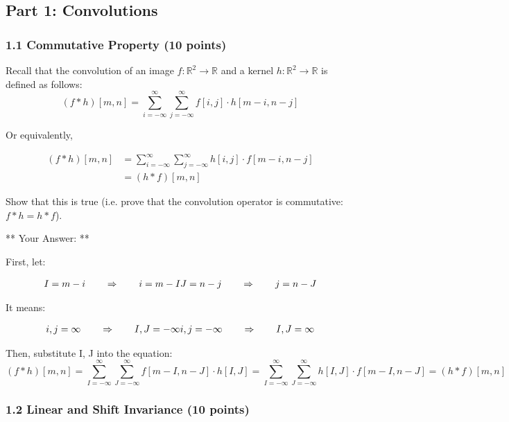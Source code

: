 \documentclass[11pt]{article}
\begin{document}
    \subsection{Part 1: Convolutions}\label{part-1-convolutions}

\subsubsection{1.1 Commutative Property (10
points)}\label{commutative-property-10-points}

Recall that the convolution of an image
\(f:\mathbb{R}^2\rightarrow \mathbb{R}\) and a kernel
\(h:\mathbb{R}^2\rightarrow\mathbb{R}\) is defined as follows:
\[(f*h)[m,n]=\sum_{i=-\infty}^\infty\sum_{j=-\infty}^\infty f[i,j]\cdot h[m-i,n-j]\]

Or equivalently,

\begin{align}
(f*h)[m,n] &= \sum_{i=-\infty}^\infty\sum_{j=-\infty}^\infty h[i,j]\cdot f[m-i,n-j]\\
&= (h*f)[m,n]
\end{align}

Show that this is true (i.e. prove that the convolution operator is
commutative: \(f*h = h*f\)).

    ** Your Answer: **

First, let:

\begin{align}
I = m - i \qquad \Rightarrow \qquad i = m - I \newline
J = n - j \qquad \Rightarrow \qquad j = n - J
\end{align}

It means:

\begin{align}
i,j = \infty \qquad \Rightarrow \qquad I,J = -\infty \newline
i,j = -\infty \qquad \Rightarrow \qquad I,J = \infty
\end{align}

Then, substitute I, J into the equation:
\[(f*h)[m,n]=\sum_{I=-\infty}^\infty\sum_{J=-\infty}^\infty f[m-I,n-J]\cdot h[I,J]=\sum_{I=-\infty}^\infty\sum_{J=-\infty}^\infty h[I,J]\cdot f[m-I,n-J]= (h*f)[m,n]\]

    \subsubsection{1.2 Linear and Shift Invariance (10
points)}\label{linear-and-shift-invariance-10-points}
\end{document}
